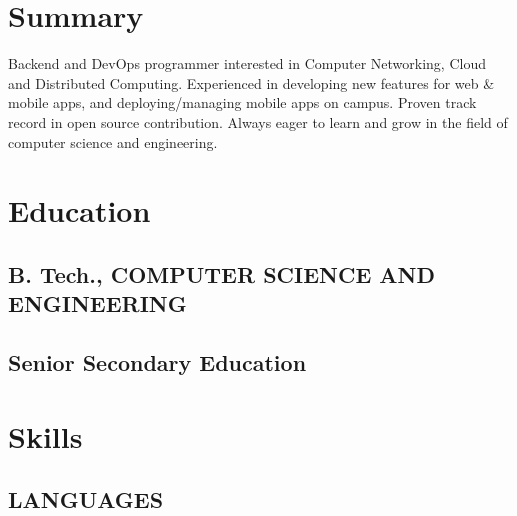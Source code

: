 \documentclass[letterpaper]{deedy-resume} %
\begin{document}
\begin{minipage}[t]{0.33\textwidth} %


\section{Summary}
Backend and DevOps programmer interested in Computer Networking, Cloud and Distributed Computing. Experienced in developing new features for web \& mobile apps, and deploying/managing mobile apps on campus. Proven track record in open source contribution. Always eager to learn and grow in the field of computer science and engineering.
\sectionspace %



\section{Education} 


\subsection{B. Tech., COMPUTER SCIENCE AND ENGINEERING }

\sectionspace %

\subsection{Senior Secondary Education}
\sectionspace %


\section{Skills}
\subsection{LANGUAGES}

\end{minipage}
\end{document}
